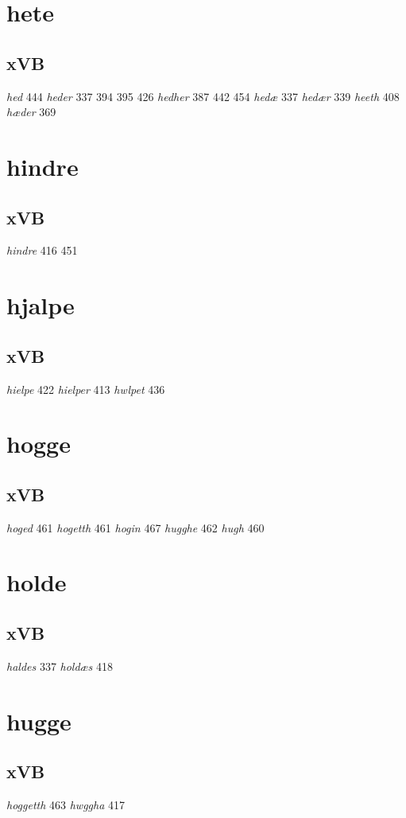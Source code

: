 \documentclass[a4paper,twocolumn]{article}
\begin{document}
\section{hete}
\label{sec:org3c05ceb}
\subsection{xVB}
\label{sec:org94699e3}
\emph{hed} 444 \emph{heder} 337 394 395 426 \emph{hedher} 387 442 454 \emph{hedæ} 337 \emph{hedær} 339 \emph{heeth} 408 \emph{hæder} 369 
\section{hindre}
\label{sec:org68bacd2}
\subsection{xVB}
\label{sec:org814c85c}
\emph{hindre} 416 451 
\section{hjalpe}
\label{sec:orge282e03}
\subsection{xVB}
\label{sec:org00a50c0}
\emph{hielpe} 422 \emph{hielper} 413 \emph{hwlpet} 436 
\section{hogge}
\label{sec:orgebf18f0}
\subsection{xVB}
\label{sec:org34f189f}
\emph{hoged} 461 \emph{hogetth} 461 \emph{hogin} 467 \emph{hugghe} 462 \emph{hugh} 460 
\section{holde}
\label{sec:org80f7f55}
\subsection{xVB}
\label{sec:orgd3aca27}
\emph{haldes} 337 \emph{holdæs} 418 
\section{hugge}
\label{sec:org468d9f1}
\subsection{xVB}
\label{sec:orgd4eec24}
\emph{hoggetth} 463 \emph{hwggha} 417 
\end{document}
